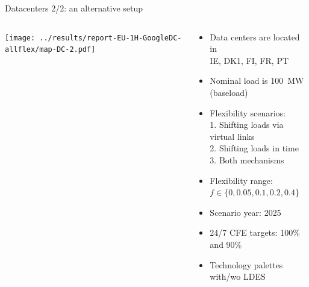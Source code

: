 \begin{frame}{Datacenters 2/2: an alternative setup}

  \begin{columns}[T]
  \begin{column}{10cm}

  \centering
  \texttt{[image: ../results/report-EU-1H-GoogleDC-allflex/map-DC-2.pdf]}


  \end{column}

  \begin{column}{6cm}
  {\small
  \begin{itemize}

  \item Data centers are located in \\ \alert{IE, DK1, FI, FR, PT}
  \item Nominal load is 100~MW (baseload)
  \item Flexibility scenarios: \\
        1. Shifting loads via virtual links \\ 
        2. Shifting loads in time \\ 
        3. Both mechanisms
  \item Flexibility range: $f \in \{0,0.05,0.1,0.2,0.4\}$ 
  \item Scenario year: 2025
  \item 24/7 CFE targets: 100\% and 90\%
  \item Technology palettes with/wo LDES
  
\end{itemize}
  }

  \end{column}
  \end{columns}

\end{frame}



